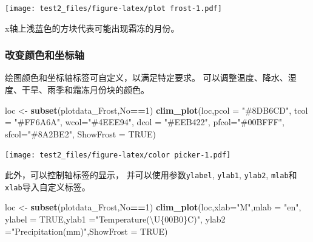 \documentclass[
]{ctexart}
\newenvironment{Shaded}{\begin{snugshade}}{\end{snugshade}}
\newcommand{\AttributeTok}[1]{\textcolor[rgb]{0.13,0.29,0.53}{#1}}
\newcommand{\ConstantTok}[1]{\textcolor[rgb]{0.56,0.35,0.01}{#1}}
\newcommand{\DecValTok}[1]{\textcolor[rgb]{0.00,0.00,0.81}{#1}}
\newcommand{\FunctionTok}[1]{\textcolor[rgb]{0.13,0.29,0.53}{\textbf{#1}}}
\newcommand{\NormalTok}[1]{#1}
\newcommand{\OtherTok}[1]{\textcolor[rgb]{0.56,0.35,0.01}{#1}}
\newcommand{\SpecialCharTok}[1]{\textcolor[rgb]{0.81,0.36,0.00}{\textbf{#1}}}
\newcommand{\StringTok}[1]{\textcolor[rgb]{0.31,0.60,0.02}{#1}}
\begin{document}
\texttt{[image: test2\_files/figure-latex/plot frost-1.pdf]}

x轴上浅蓝色的方块代表可能出现霜冻的月份。

\hypertarget{ux6539ux53d8ux989cux8272ux548cux5750ux6807ux8f74}{%
\subsubsection{改变颜色和坐标轴}\label{ux6539ux53d8ux989cux8272ux548cux5750ux6807ux8f74}}

绘图颜色和坐标轴标签可自定义，以满足特定要求。
可以调整温度、降水、湿度、干旱、雨季和霜冻月份块的颜色。

\begin{Shaded}
\begin{Highlighting}[]
\NormalTok{loc }\OtherTok{\textless{}{-}} \FunctionTok{subset}\NormalTok{(plotdata\_Frost,No}\SpecialCharTok{==}\DecValTok{1}\NormalTok{)}
\FunctionTok{clim\_plot}\NormalTok{(loc,}\AttributeTok{pcol =} \StringTok{"\#8DB6CD"}\NormalTok{,}
          \AttributeTok{tcol =} \StringTok{"\#FF6A6A"}\NormalTok{,}
          \AttributeTok{wcol=}\StringTok{"\#4EEE94"}\NormalTok{,}
          \AttributeTok{dcol =} \StringTok{"\#EEB422"}\NormalTok{,}
          \AttributeTok{pfcol=}\StringTok{"\#00BFFF"}\NormalTok{,}
          \AttributeTok{sfcol=}\StringTok{"\#8A2BE2"}\NormalTok{,}
          \AttributeTok{ShowFrost =} \ConstantTok{TRUE}\NormalTok{)}
\end{Highlighting}
\end{Shaded}

\texttt{[image: test2\_files/figure-latex/color picker-1.pdf]}

此外，可以控制轴标签的显示， 并可以使用参数\texttt{ylabel},
\texttt{ylab1}, \texttt{ylab2},
\texttt{mlab}和\texttt{xlab}导入自定义标签。

\begin{Shaded}
\begin{Highlighting}[]
\NormalTok{loc }\OtherTok{\textless{}{-}} \FunctionTok{subset}\NormalTok{(plotdata\_Frost,No}\SpecialCharTok{==}\DecValTok{1}\NormalTok{)}
\FunctionTok{clim\_plot}\NormalTok{(loc,}\AttributeTok{xlab=}\StringTok{"M"}\NormalTok{,}\AttributeTok{mlab =} \StringTok{"en"}\NormalTok{,}
          \AttributeTok{ylabel =} \ConstantTok{TRUE}\NormalTok{,}\AttributeTok{ylab1 =}\StringTok{"Temperature(\textbackslash{}U\{00B0\}C)"}\NormalTok{,}
          \AttributeTok{ylab2 =}\StringTok{"Precipitation(mm)"}\NormalTok{,}\AttributeTok{ShowFrost =} \ConstantTok{TRUE}\NormalTok{)}
\end{Highlighting}
\end{Shaded}
\end{document}
